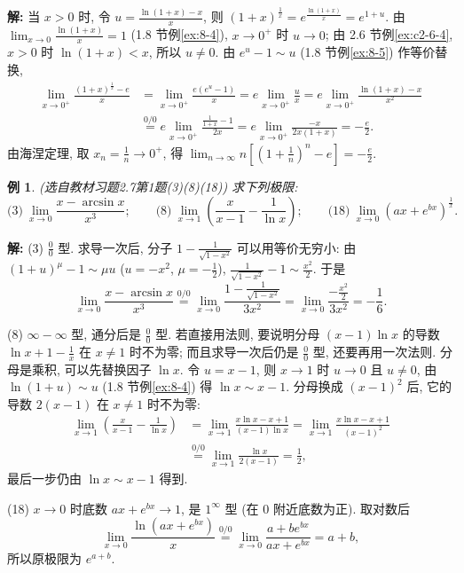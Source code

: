 \documentclass[UTF8,openany]{ctexbook}
\theoremstyle{chinesetextbook}
\newtheorem{example}{例}[section]
\newenvironment{cnsolution}{\par\indent\textbf{解:} \ignorespaces}{\par}
\begin{document}
\begin{cnsolution}
当 $x>0$ 时, 令 $\displaystyle u=\frac{\ln(1+x)-x}x$, 则 $(1+x)^{\frac1x}=e^{\frac{\ln(1+x)}x}=e^{1+u}$. 由 $\displaystyle\lim_{x\to0}\frac{\ln(1+x)}x=1$ (1.8 节例\ref{ex:8-4}), $x\to0^+$ 时 $u\to0$; 由 2.6 节例\ref{ex:c2-6-4}, $x>0$ 时 $\ln(1+x)<x$, 所以 $u\ne0$. 由 $e^u-1\sim u$ (1.8 节例\ref{ex:8-5}) 作等价替换,
\[
\begin{aligned}
\lim_{x\to0^+}\frac{(1+x)^{\frac1x}-e}x&=\lim_{x\to0^+}\frac{e\left(e^u-1\right)}x=e\lim_{x\to0^+}\frac ux=e\lim_{x\to0^+}\frac{\ln(1+x)-x}{x^2}\\
&\overset{0/0}{=}e\lim_{x\to0^+}\frac{\frac1{1+x}-1}{2x}=e\lim_{x\to0^+}\frac{-x}{2x(1+x)}=-\frac e2.
\end{aligned}
\]
由海涅定理, 取 $\displaystyle x_n=\frac1n\to0^+$, 得 $\displaystyle\lim_{n\to\infty}n\left[\left(1+\frac1n\right)^n-e\right]=-\frac e2$.
\end{cnsolution}
\begin{example}\label{ex:c2-h7-1}
\textnormal{(选自教材习题2.7第1题(3)(8)(18))} 求下列极限:
\[
\text{(3)}\ \lim_{x\to0}\frac{x-\arcsin x}{x^3};\qquad\text{(8)}\ \lim_{x\to1}\left(\frac x{x-1}-\frac1{\ln x}\right);\qquad\text{(18)}\ \lim_{x\to0}\left(ax+e^{bx}\right)^{\frac1x}.
\]
\end{example}
\begin{cnsolution}
(3) $\displaystyle\frac00$ 型. 求导一次后, 分子 $\displaystyle1-\frac1{\sqrt{1-x^2}}$ 可以用等价无穷小: 由 $(1+u)^\mu-1\sim\mu u$ ($u=-x^2$, $\displaystyle\mu=-\frac12$), $\displaystyle\frac1{\sqrt{1-x^2}}-1\sim\frac{x^2}2$. 于是
\[
\lim_{x\to0}\frac{x-\arcsin x}{x^3}\overset{0/0}{=}\lim_{x\to0}\frac{1-\frac1{\sqrt{1-x^2}}}{3x^2}=\lim_{x\to0}\frac{-\frac{x^2}2}{3x^2}=-\frac16.
\]

(8) $\infty-\infty$ 型, 通分后是 $\displaystyle\frac00$ 型. 若直接用法则, 要说明分母 $(x-1)\ln x$ 的导数 $\displaystyle\ln x+1-\frac1x$ 在 $x\ne1$ 时不为零; 而且求导一次后仍是 $\displaystyle\frac00$ 型, 还要再用一次法则. 分母是乘积, 可以先替换因子 $\ln x$. 令 $u=x-1$, 则 $x\to1$ 时 $u\to0$ 且 $u\ne0$, 由 $\ln(1+u)\sim u$ (1.8 节例\ref{ex:8-4}) 得 $\ln x\sim x-1$. 分母换成 $(x-1)^2$ 后, 它的导数 $2(x-1)$ 在 $x\ne1$ 时不为零:
\[
\begin{aligned}
\lim_{x\to1}\left(\frac x{x-1}-\frac1{\ln x}\right)&=\lim_{x\to1}\frac{x\ln x-x+1}{(x-1)\ln x}=\lim_{x\to1}\frac{x\ln x-x+1}{(x-1)^2}\\
&\overset{0/0}{=}\lim_{x\to1}\frac{\ln x}{2(x-1)}=\frac12,
\end{aligned}
\]
最后一步仍由 $\ln x\sim x-1$ 得到.

(18) $x\to0$ 时底数 $ax+e^{bx}\to1$, 是 $1^\infty$ 型 (在 $0$ 附近底数为正). 取对数后
\[
\lim_{x\to0}\frac{\ln\left(ax+e^{bx}\right)}x\overset{0/0}{=}\lim_{x\to0}\frac{a+be^{bx}}{ax+e^{bx}}=a+b,
\]
所以原极限为 $e^{a+b}$.
\end{cnsolution}
\end{document}
